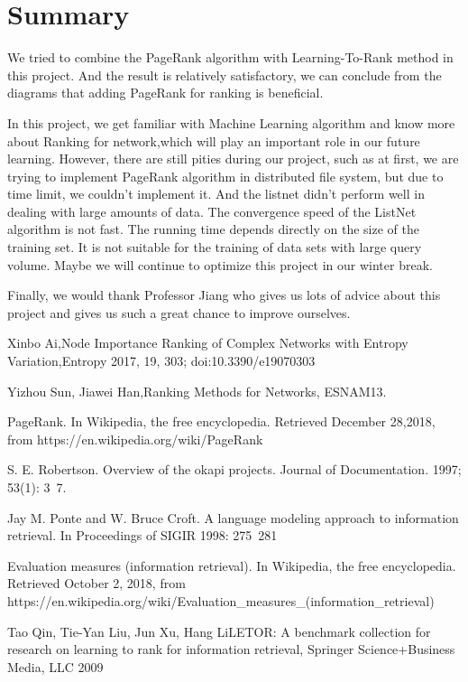 \documentclass{acmtog} %
\begin{document}
\section{Summary}
We tried to combine the PageRank algorithm with Learning-To-Rank method in this project. And the result is relatively satisfactory, we can conclude from the diagrams that adding PageRank for ranking is beneficial.

In this project, we get familiar with Machine Learning algorithm and know more about Ranking for network,which will play an important role in our future learning. However, there are still pities during our project, such as at first, we are trying to implement PageRank algorithm in distributed file system, but due to time limit, we couldn't implement it. And the listnet didn't perform well in dealing with large amounts of data. The convergence speed of the ListNet algorithm is not fast. The running time depends directly on the size of the training set. It is not suitable for the training of data sets with large query volume. Maybe we will continue to optimize this project in our winter break.


Finally, we would thank Professor Jiang who gives us lots of advice about this project and gives us such a great chance to improve ourselves.



\begin{thebibliography}{99}  
Xinbo Ai,Node Importance Ranking of Complex Networks with Entropy Variation,Entropy 2017, 19, 303; doi:10.3390/e19070303

Yizhou Sun, Jiawei Han,Ranking Methods for Networks, ESNAM13.  

PageRank.  In Wikipedia, the free encyclopedia. Retrieved December 28,2018, from https://en.wikipedia.org/wiki/PageRank
 
 S. E. Robertson. Overview of the okapi projects. Journal
of Documentation. 1997; 53(1): 3~7.

 Jay M. Ponte and W. Bruce Croft. A language modeling
approach to information retrieval. In Proceedings of
SIGIR 1998: 275~281

 Evaluation measures (information retrieval).  In Wikipedia, the free encyclopedia. Retrieved October 2, 2018, from https://en.wikipedia.org/wiki/Evaluation\_measures\_(information\_retrieval)

 Tao Qin, Tie-Yan Liu, Jun Xu, Hang LiLETOR: A benchmark collection for research on learning to rank for information retrieval, Springer Science+Business Media, LLC 2009

\end{thebibliography}
\end{document}
